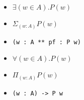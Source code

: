 \documentclass[xetex,xcolor={usenames,dvipsnames},mathserif,serif,17pt]{beamer}
\begin{document}
\fontsize{24}{24}\selectfont

\begin{frame}
  \begin{itemize}
  \item $\exists (w \in A). P(w)$
  \item $\Sigma_{(w:A)} P(w)$
  \item \lstinline{(w : A ** pf : P w)}
  \end{itemize}
\end{frame}

\begin{frame}
  \begin{itemize}
  \item $\forall (w \in A). P(w)$
  \item $\Pi_{(w:A)} P(w)$
  \item \lstinline{(w : A) -> P w}
  \end{itemize}
\end{frame}
\end{document}
